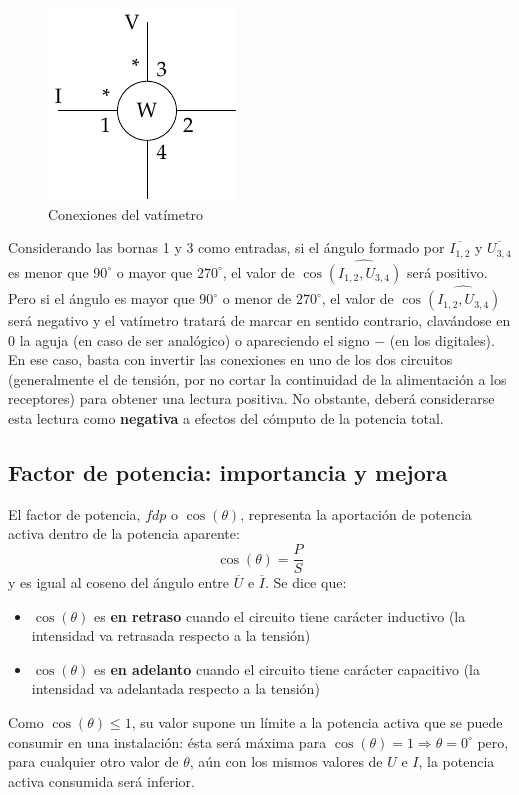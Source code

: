 	\begin{figure}[H]
	    \centering
	    \includegraphics{../figs/vatimetro_2.pdf}
	    \caption{Conexiones del vatímetro}
	    \label{fig.vatimetro_2}
	\end{figure}
	Considerando las bornas 1 y 3 como entradas, si el ángulo formado por $\overline{I_{1,2}}$ y $\overline{U_{3,4}}$ es menor que $90^\circ$ o mayor que $270^\circ$, el valor de $\cos\widehat{(I_{1,2}, U_{3,4})}$ será positivo. Pero si el ángulo es mayor que $90^\circ$ o menor de $270^\circ$, el valor de  $\cos\widehat{(I_{1,2}, U_{3,4})}$ será negativo y el vatímetro tratará de marcar en sentido contrario, clavándose en $0$ la aguja (en caso de ser analógico) o apareciendo el signo $-$ (en los digitales). En ese caso, basta con invertir las conexiones en uno de los dos circuitos (generalmente el de tensión, por no cortar la continuidad de la alimentación a los receptores) para obtener una lectura positiva. No obstante, deberá considerarse esta lectura como \textbf{negativa} a efectos del cómputo de la potencia total. 
	
	
	\subsection{Factor de potencia: importancia y mejora}\label{sec.mejora_fdp_monofasica}
	
	El factor de potencia, $fdp$ o $\cos(\theta)$, representa la aportación de potencia activa dentro de la potencia aparente:
	\begin{equation}
		\boxed{\cos(\theta)=\dfrac{P}{S}}
	\end{equation}
	y es igual al coseno del ángulo entre $\overline{U}$ e $\overline{I}$. Se dice que:
	\begin{itemize}
		\item $\cos(\theta)$ es \textbf{en retraso} cuando el circuito tiene carácter inductivo (la intensidad va retrasada respecto a la tensión)
		\item $\cos(\theta)$ es \textbf{en adelanto} cuando el circuito tiene carácter capacitivo (la intensidad va adelantada respecto a la tensión)
	\end{itemize}
	\begin{remark}
		Como $\cos(\theta)\leq 1$, su valor supone un límite a la potencia activa que se puede consumir en una instalación: ésta será máxima para $\cos(\theta)=1\Rightarrow \theta=0^\circ$ pero, para cualquier otro valor de $\theta$, aún con los mismos valores de $U$ e $I$, la potencia activa consumida será inferior. 
	\end{remark}
	

